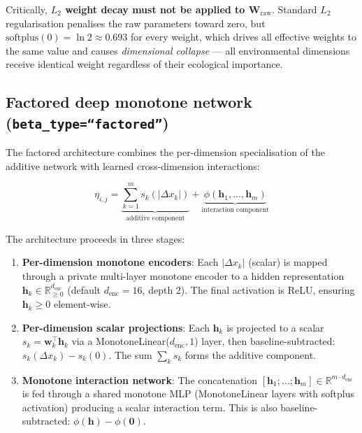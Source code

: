 \documentclass{article}
\begin{document}
Critically, \textbf{$L_2$ weight decay must not be applied to $\mathbf{W}_{\text{raw}}$}. Standard $L_2$ regularisation penalises the raw parameters toward zero, but $\text{softplus}(0) = \ln 2 \approx 0.693$ for every weight, which drives all effective weights to the same value and causes \textit{dimensional collapse} --- all environmental dimensions receive identical weight regardless of their ecological importance.
\label{sec:monotone-linear}

\subsection{Factored deep monotone network (\texttt{beta\_type=``factored''})}
\label{sec:factored-beta}

The factored architecture combines the per-dimension specialisation of the additive network with learned cross-dimension interactions:

\begin{equation}
    \eta_{i,j} = \underbrace{\sum_{k=1}^{m} s_k\!\left(|\Delta x_k|\right)}_{\text{additive component}} + \underbrace{\phi\!\left(\mathbf{h}_1, \ldots, \mathbf{h}_m\right)}_{\text{interaction component}}
\end{equation}

The architecture proceeds in three stages:
\begin{enumerate}
    \item \textbf{Per-dimension monotone encoders}: Each $|\Delta x_k|$ (scalar) is mapped through a private multi-layer monotone encoder to a hidden representation $\mathbf{h}_k \in \mathbb{R}^{d_{\text{enc}}}_{\geq 0}$ (default $d_{\text{enc}} = 16$, depth 2). The final activation is ReLU, ensuring $\mathbf{h}_k \geq 0$ element-wise.
    
    \item \textbf{Per-dimension scalar projections}: Each $\mathbf{h}_k$ is projected to a scalar $s_k = \mathbf{w}_k^\top \mathbf{h}_k$ via a MonotoneLinear($d_{\text{enc}}, 1$) layer, then baseline-subtracted: $s_k(\Delta x_k) - s_k(0)$. The sum $\sum_k s_k$ forms the additive component.
    
    \item \textbf{Monotone interaction network}: The concatenation $[\mathbf{h}_1; \ldots; \mathbf{h}_m] \in \mathbb{R}^{m \cdot d_{\text{enc}}}$ is fed through a shared monotone MLP (MonotoneLinear layers with softplus activation) producing a scalar interaction term. This is also baseline-subtracted: $\phi(\mathbf{h}) - \phi(\mathbf{0})$.
\end{enumerate}
\end{document}
